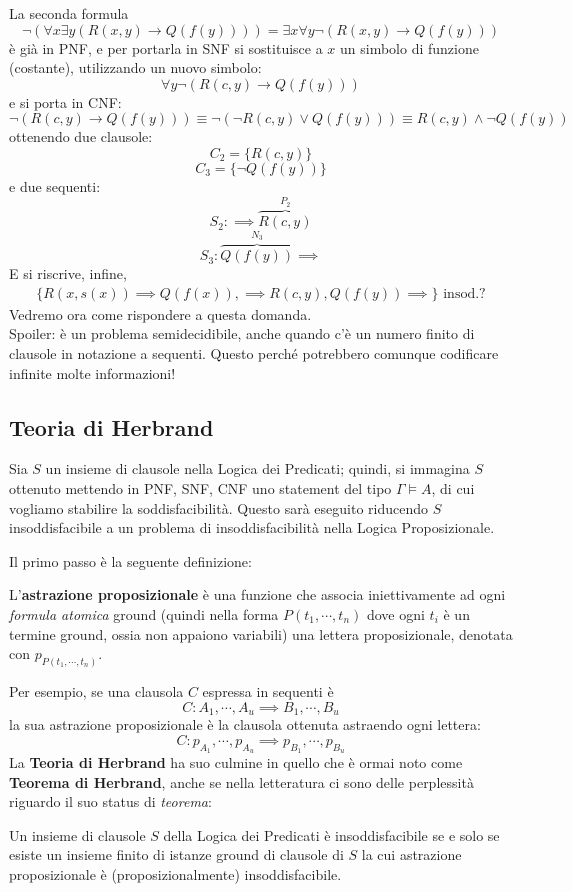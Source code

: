 La seconda formula 
$$
\neg (\forall x \exists y (R(x,y) \rightarrow Q(f(y)))) = \exists x \forall y \neg (R(x,y) \rightarrow Q(f(y)))
$$
è già in PNF, e per portarla in SNF si sostituisce a $x$ un simbolo di funzione
(costante), utilizzando un nuovo simbolo:
$$
\forall y \neg (R(c, y) \rightarrow Q(f(y)))
$$
e si porta in CNF: 
$$
\neg (R(c,y) \rightarrow Q(f(y))) \equiv
\neg (\neg R(c,y) \lor Q(f(y))) \equiv
R(c,y) \land \neg Q(f(y))
$$
ottenendo  due clausole: 
$$
C_2 = \{R(c,y)\}
$$
$$
C_3 = \{\neg Q(f(y))\}
$$
e due sequenti: 
$$
S_2 : \implies \overbrace{R(c,y)}^{P_2}
$$
$$
S_3 : \overbrace{Q(f(y))}^{N_3} \implies
$$
E si riscrive, infine, 
\begin{align}
\label{enuciato-in-sequenti}
  \{ R(x,s(x)) \implies Q(f(x)), \implies R(c,y), Q(f(y)) \implies\} \text{ insod.?}
\end{align}
Vedremo ora come rispondere a questa domanda. \\
Spoiler: è un problema semidecidibile, anche quando c'è un numero finito di clausole in notazione a sequenti. Questo perché potrebbero comunque codificare infinite molte informazioni! 

\subsection{Teoria di Herbrand}
Sia $S$ un insieme di clausole nella Logica dei Predicati; quindi, si immagina $S$ 
ottenuto mettendo in PNF, SNF, CNF uno statement del tipo $\Gamma \models A$, 
di cui vogliamo stabilire la soddisfacibilità. Questo sarà eseguito riducendo 
$S$ insoddisfacibile a un problema di insoddisfacibilità nella Logica Proposizionale.

Il primo passo è la seguente definizione: 
\begin{defi}
  L'\textbf{astrazione proposizionale} è una funzione che associa iniettivamente ad ogni \textit{formula atomica} ground (quindi nella forma $P(t_1, \cdots, t_n)$ dove ogni $t_i$ è un termine ground, ossia non appaiono variabili) una lettera proposizionale, denotata con $p_{P(t_1, \cdots, t_n)}$. 
\end{defi}

Per esempio, se una clausola $C$ espressa in sequenti è 
$$
C: A_1, \cdots, A_u \implies B_1, \cdots, B_u
$$
la sua astrazione proposizionale è la clausola ottenuta astraendo ogni lettera: 
$$
C: p_{A_1}, \cdots, p_{A_u} \implies p_{B_1}, \cdots, p_{B_u}
$$
La \textbf{Teoria di Herbrand} ha suo culmine in quello che è ormai noto 
come \textbf{Teorema di Herbrand}, anche se nella letteratura ci sono delle 
perplessità riguardo il suo status di \textit{teorema}: 
\begin{teo}[di Herbrand]
        Un insieme di clausole $S$ della Logica dei Predicati è insoddisfacibile 
        se e solo se esiste un insieme finito di istanze ground di clausole 
        di $S$ la cui astrazione proposizionale è (proposizionalmente) insoddisfacibile.
\end{teo}

